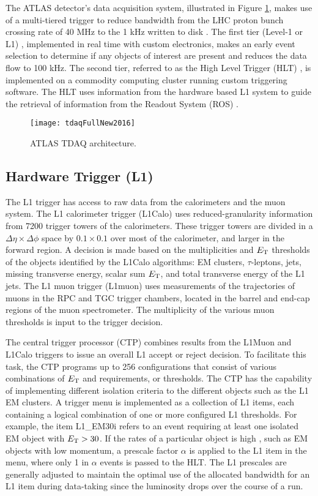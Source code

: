 The ATLAS  detector's data acquisition system, illustrated in Figure \ref{fig:tdaq_diagram}, makes use of a multi-tiered trigger to reduce 
bandwidth from the LHC proton bunch crossing rate of 40 MHz
to the 1 kHz written to disk \cite{evolution1,evolution2}. The first tier (Level-1 or L1) \cite{l1}, implemented in real time with custom electronics, 
makes an early event selection to determine if any objects of interest are present and reduces the data flow to 
100 kHz. The second tier, referred to as the High Level Trigger (HLT) \cite{hlt}, is implemented on a commodity computing cluster running custom triggering software. The HLT uses information from the
hardware based L1 system to guide the retrieval of information from the Readout System (ROS) \cite{ros}. 

\begin{figure}[!t]
\centering
\texttt{[image: tdaqFullNew2016]}
\vspace{-0.5cm}
\caption{ATLAS TDAQ architecture.}
\label{fig:tdaq_diagram}
\end{figure} 

\subsection{Hardware Trigger (L1)}
The L1 trigger has access to raw data from the calorimeters and the 
muon system. The L1 calorimeter trigger (L1Calo) uses reduced-granularity
information from 7200 trigger towers of the calorimeters. These trigger 
towers are divided in a $\Delta\eta\times\Delta\phi$ space by 
$0.1 \times 0.1$ over most of the calorimeter, and larger in the forward 
region. A decision is made based on the multiplicities and $E_{\rm{T}}$ 
thresholds of the objects 
identified by the L1Calo algorithms: EM clusters, 
$\tau$-leptons, jets, missing transverse energy, scalar sum $E_{\rm{T}}$, 
and total transverse energy of the L1 jets.
The L1 muon trigger (L1muon) uses measurements of the trajectories of muons 
in the RPC and TGC trigger chambers, located in the barrel and end-cap regions 
of the muon spectrometer. The multiplicity of the various muon \pt thresholds
is input to the trigger decision.

The central trigger processor (CTP) combines results from the L1Muon and L1Calo
triggers to issue an overall L1 accept or reject decision.
To facilitate this task, the CTP programs up to 256 configurations that 
consist of various combinations of $E_{\rm{T}}$ and \pt requirements, 
or thresholds.
The CTP has the capability of implementing different isolation criteria 
to the different objects such as the L1 EM clusters. 
A trigger menu is implemented as a collection of L1 items, each containing a 
logical combination of one or more configured L1 thresholds. 
For example, the item L1\_EM30i refers to an event requiring at least one 
isolated EM object with $E_{\rm{T}} > 30 $\GeV. If the rates of a particular 
object is high , such as EM objects with low momentum, a prescale factor $\alpha$ is applied to the L1 item in the menu, where only 1 in $\alpha$
events is passed to the HLT. The L1 prescales are generally adjusted to 
maintain the optimal use of the allocated bandwidth for an L1 item during 
data-taking since the luminosity drops over the course of a run.

